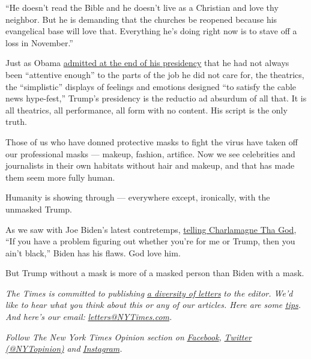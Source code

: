 ``He doesn't read the Bible and he doesn't live as a Christian and love
thy neighbor. But he is demanding that the churches be reopened because
his evangelical base will love that. Everything he's doing right now is
to stave off a loss in November.''

Just as Obama
\href{https://www.theatlantic.com/magazine/archive/2016/04/the-obama-doctrine/471525/}{admitted
at the end of his presidency} that he had not always been ``attentive
enough'' to the parts of the job he did not care for, the theatrics, the
``simplistic'' displays of feelings and emotions designed ``to satisfy
the cable news hype-fest,'' Trump's presidency is the reductio ad
absurdum of all that. It is all theatrics, all performance, all form
with no content. His script is the only truth.

Those of us who have donned protective masks to fight the virus have
taken off our professional masks --- makeup, fashion, artifice. Now we
see celebrities and journalists in their own habitats without hair and
makeup, and that has made them seem more fully human.

Humanity is showing through --- everywhere except, ironically, with the
unmasked Trump.

As we saw with Joe Biden's latest contretemps,
\href{https://www.nytimes3xbfgragh.onion/2020/05/22/us/politics/joe-biden-black-breakfast-club.html}{telling
Charlamagne Tha God}, ``If you have a problem figuring out whether
you're for me or Trump, then you ain't black,'' Biden has his flaws. God
love him.

But Trump without a mask is more of a masked person than Biden with a
mask.

\emph{The Times is committed to publishing}
\href{https://www.nytimes3xbfgragh.onion/2019/01/31/opinion/letters/letters-to-editor-new-york-times-women.html}{\emph{a
diversity of letters}} \emph{to the editor. We'd like to hear what you
think about this or any of our articles. Here are some}
\href{https://help.nytimes3xbfgragh.onion/hc/en-us/articles/115014925288-How-to-submit-a-letter-to-the-editor}{\emph{tips}}\emph{.
And here's our email:}
\href{mailto:letters@NYTimes.com}{\emph{letters@NYTimes.com}}\emph{.}

\emph{Follow The New York Times Opinion section on}
\href{https://www.facebookcorewwwi.onion/nytopinion}{\emph{Facebook}}\emph{,}
\href{http://twitter.com/NYTOpinion}{\emph{Twitter (@NYTopinion)}}
\emph{and}
\href{https://www.instagram.com/nytopinion/}{\emph{Instagram}}\emph{.}


